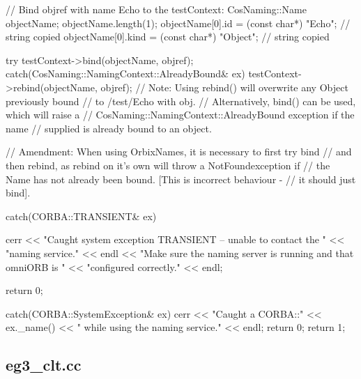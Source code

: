 \documentclass[11pt,twoside,a4paper]{book}
\begin{document}
\begin{cxxlisting}
{{    // Bind objref with name Echo to the testContext:
    CosNaming::Name objectName;
    objectName.length(1);
    objectName[0].id   = (const char*) "Echo";   // string copied
    objectName[0].kind = (const char*) "Object"; // string copied

    try {
      testContext->bind(objectName, objref);
    }
    catch(CosNaming::NamingContext::AlreadyBound& ex) {
      testContext->rebind(objectName, objref);
    }
    // Note: Using rebind() will overwrite any Object previously bound
    //       to /test/Echo with obj.
    //       Alternatively, bind() can be used, which will raise a
    //       CosNaming::NamingContext::AlreadyBound exception if the name
    //       supplied is already bound to an object.

    // Amendment: When using OrbixNames, it is necessary to first try bind
    // and then rebind, as rebind on it's own will throw a NotFoundexception if
    // the Name has not already been bound. [This is incorrect behaviour -
    // it should just bind].
  }
  catch(CORBA::TRANSIENT& ex) {
    cerr << "Caught system exception TRANSIENT -- unable to contact the "
         << "naming service." << endl
	 << "Make sure the naming server is running and that omniORB is "
	 << "configured correctly." << endl;

    return 0;
  }
  catch(CORBA::SystemException& ex) {
    cerr << "Caught a CORBA::" << ex._name()
	 << " while using the naming service." << endl;
    return 0;
  }
  return 1;
}
\end{cxxlisting}


\clearpage
\subsection{eg3\_clt.cc}
\end{document}
